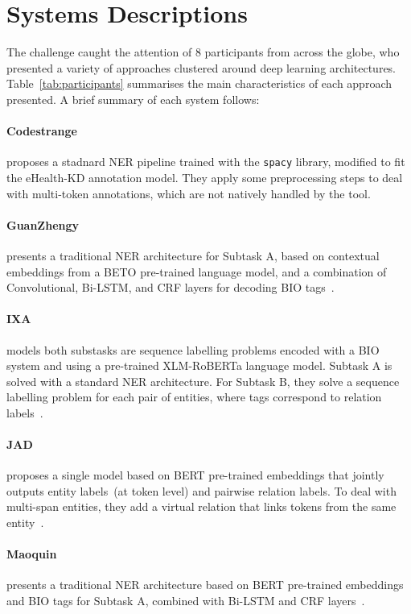 \documentclass[a4paper,11pt,twocolumn,twoside]{article}
\begin{document}
\section{Systems Descriptions}\label{sec:systems}

The challenge caught the attention of 8 participants from across the globe,
who presented a variety of approaches clustered around deep learning architectures.
Table~\ref{tab:participants} summarises the main characteristics of each approach presented.
A brief summary of each system follows:

  \paragraph{Codestrange} proposes a stadnard NER pipeline trained with the \texttt{spacy} library, modified to fit the eHealth-KD annotation model. They apply some preprocessing steps to deal with multi-token annotations, which are not natively handled by the tool.

  \paragraph{GuanZhengy} presents a traditional NER architecture for Subtask A, based on contextual embeddings from a BETO pre-trained language model, and a combination of Convolutional, Bi-LSTM, and CRF layers for decoding BIO tags~\cite{GuanZhengyi2021}.

  \paragraph{IXA} models both substasks are sequence labelling problems encoded with a BIO system and using a pre-trained XLM-RoBERTa language model. Subtask A is solved with a standard NER architecture. For Subtask B, they solve a sequence labelling problem for each pair of entities, where tags correspond to relation labels~\cite{edgarandres2021}.

  \paragraph{JAD} proposes a single model based on BERT pre-trained embeddings that jointly outputs entity labels~(at token level) and pairwise relation labels. To deal with multi-span entities, they add a virtual relation that links tokens from the same entity~\cite{JAD2021}.

  \paragraph{Maoquin} presents a traditional NER architecture based on BERT pre-trained embeddings and BIO tags for Subtask A, combined with Bi-LSTM and CRF layers~\cite{Maoqin2021}.
\end{document}
